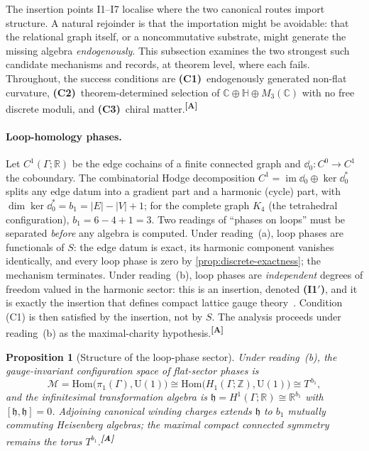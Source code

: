 \documentclass[12pt,a4paper,twoside]{article}
\theoremstyle{plain}
\newtheorem{proposition}[theorem]{Proposition}
\theoremstyle{definition}
\theoremstyle{remark}
\newcommand{\catmark}[1]{\textsuperscript{\textsf{\textbf{[#1]}}}}
\begin{document}
The insertion points I1--I7 localise where the two canonical routes import
structure. A natural rejoinder is that the importation might be avoidable:
that the relational graph itself, or a noncommutative substrate, might
generate the missing algebra \emph{endogenously}. This subsection examines
the two strongest such candidate mechanisms and records, at theorem level,
where each fails. Throughout, the success conditions are
\textbf{(C1)}~endogenously generated non-flat curvature,
\textbf{(C2)}~theorem-determined selection of
$\mathbb{C}\oplus\mathbb{H}\oplus M_3(\mathbb{C})$ with no free discrete
moduli, and \textbf{(C3)}~chiral matter.\catmark{A}

\paragraph{Loop-homology phases.}
Let $C^1(\Gamma;\mathbb{R})$ be the edge cochains of a finite connected
graph and $\dd_{0}:C^0\to C^1$ the coboundary. The combinatorial Hodge
decomposition $C^1=\operatorname{im}\dd_{0}\oplus\ker\dd_{0}^{*}$ splits
any edge datum into a gradient part and a harmonic (cycle) part, with
$\dim\ker\dd_{0}^{*}=b_1=|E|-|V|+1$; for the complete graph $K_4$ (the
tetrahedral configuration), $b_1=6-4+1=3$. Two readings of ``phases on
loops'' must be separated \emph{before} any algebra is computed. Under
reading~(a), loop phases are functionals of $S$: the edge datum is exact,
its harmonic component vanishes identically, and every loop phase is zero
by \cref{prop:discrete-exactness}; the mechanism terminates. Under
reading~(b), loop phases are \emph{independent} degrees of freedom valued
in the harmonic sector: this is an insertion, denoted \textbf{(I1$'$)},
and it is exactly the insertion that defines compact lattice gauge
theory~\cite{wilson1974}. Condition (C1) is then satisfied by the
insertion, not by $S$. The analysis proceeds under reading~(b) as the
maximal-charity hypothesis.\catmark{A}

\begin{proposition}[Structure of the loop-phase sector]
\label{prop:loop-phase-structure}
Under reading~(b), the gauge-invariant configuration space of flat-sector
phases is
\[
\mathcal{M}
=\mathrm{Hom}\big(\pi_1(\Gamma),\mathrm{U}(1)\big)
\cong\mathrm{Hom}\big(H_1(\Gamma;\mathbb{Z}),\mathrm{U}(1)\big)
\cong T^{\,b_1},
\]
and the infinitesimal transformation algebra is
$\mathfrak{h}=H^1(\Gamma;\mathbb{R})\cong\mathbb{R}^{b_1}$ with
$[\mathfrak{h},\mathfrak{h}]=0$. Adjoining canonical winding charges
extends $\mathfrak{h}$ to $b_1$ mutually commuting Heisenberg algebras;
the maximal compact connected symmetry remains the torus
$T^{b_1}$.\catmark{A}
\end{proposition}
\end{document}
